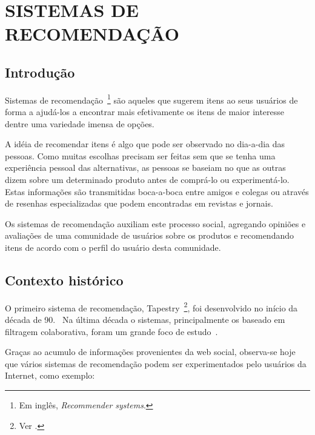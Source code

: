 \chapter{SISTEMAS DE RECOMENDAÇÃO} %
\label{cha:sistemas_de_recomendação}

\section{Introdução}
Sistemas de recomendação~\footnote{Em inglês, \textit{Recommender systems}.} são aqueles que sugerem itens ao seus usuários de forma a ajudá-los a encontrar mais efetivamente os itens de maior interesse dentre uma variedade imensa de opções.

A idéia de recomendar itens é algo que pode ser observado no dia-a-dia das pessoas. Como muitas escolhas precisam ser feitas sem que se tenha uma experiência pessoal das alternativas, as pessoas se baseiam no que as outras dizem sobre um determinado produto antes de comprá-lo ou experimentá-lo. Estas informações são transmitidas boca-a-boca entre amigos e colegas ou através de resenhas especializadas que podem encontradas em revistas e jornais.

Os sistemas de recomendação auxiliam este processo social, agregando opiniões e avaliações de uma comunidade de usuários sobre os produtos e recomendando itens de acordo com o perfil do usuário desta comunidade.

\section{Contexto histórico}
O primeiro sistema de recomendação, Tapestry~\footnote{Ver \cite{Goldberg92}.}, foi desenvolvido no início da década de 90.~\cite{Resnick97} Na última década o sistemas, principalmente os baseado em filtragem colaborativa, foram um grande foco de estudo~\cite{Herlocker04}.

Graças ao acumulo de informações provenientes da web social, observa-se hoje que vários sistemas de recomendação podem ser experimentados pelo usuários da Internet, como exemplo:

